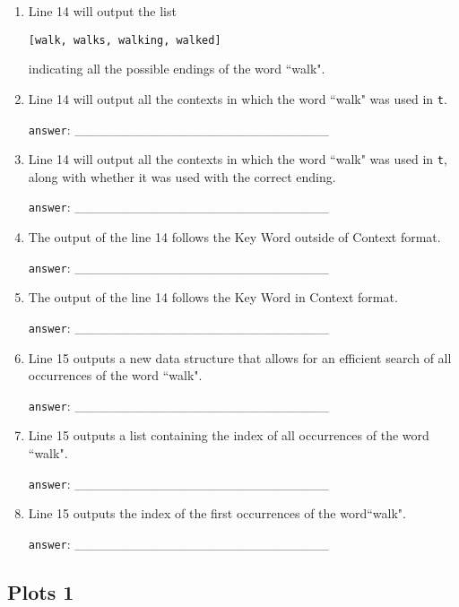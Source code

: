 \documentclass[a4paper,11pt]{scrartcl}
\begin{document}
\begin{enumerate}[label=\alph*)]
\item Line 14 will output the list
\begin{verbatim}
[walk, walks, walking, walked]
\end{verbatim}
indicating all the possible endings of the word ``walk".

\item Line 14 will output all the contexts in which the word ``walk" was used
in \verb|t|.

\verb|answer|: \_\_\_\_\_\_\_\_\_\_\_\_\_\_\_\_\_\_\_\_\_\_\_\_\_\_\_

\item Line 14 will output all the contexts in which the word ``walk" was used in
\verb|t|, along with whether it was used with the correct ending.

\verb|answer|: \_\_\_\_\_\_\_\_\_\_\_\_\_\_\_\_\_\_\_\_\_\_\_\_\_\_\_

\item The output of the line 14 follows the Key Word outside of Context format.

\verb|answer|: \_\_\_\_\_\_\_\_\_\_\_\_\_\_\_\_\_\_\_\_\_\_\_\_\_\_\_

\item The output of the line 14 follows the Key Word in Context format.

\verb|answer|: \_\_\_\_\_\_\_\_\_\_\_\_\_\_\_\_\_\_\_\_\_\_\_\_\_\_\_

\item Line 15 outputs a new data structure that allows for an efficient search
of all occurrences of the word ``walk".

\verb|answer|: \_\_\_\_\_\_\_\_\_\_\_\_\_\_\_\_\_\_\_\_\_\_\_\_\_\_\_

\item Line 15 outputs a list containing the index of all occurrences of the word
``walk".

\verb|answer|: \_\_\_\_\_\_\_\_\_\_\_\_\_\_\_\_\_\_\_\_\_\_\_\_\_\_\_

\item Line 15 outputs the index of the first occurrences of the word``walk".

\verb|answer|: \_\_\_\_\_\_\_\_\_\_\_\_\_\_\_\_\_\_\_\_\_\_\_\_\_\_\_

\end{enumerate}



\subsection{Plots 1}
\end{document}
